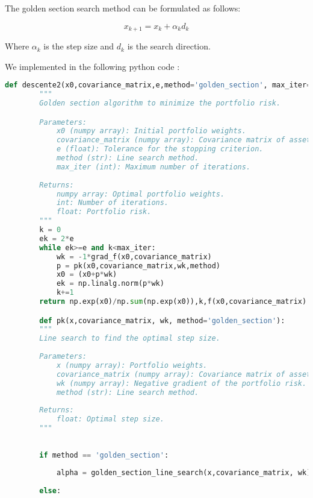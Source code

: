 \documentclass[12pt]{article}
\begin{document}
The golden section search method can be formulated as follows:

\begin{equation}
    x_{k+1} = x_k + \alpha_k d_k
\end{equation}
    
    Where $\alpha_k$ is the step size and $d_k$ is the search direction.

We implemented in the following python code :


\begin{lstlisting}[language=Python]
    def descente2(x0,covariance_matrix,e,method='golden_section', max_iter=10000):
        """
        Golden section algorithm to minimize the portfolio risk.

        Parameters:
            x0 (numpy array): Initial portfolio weights.
            covariance_matrix (numpy array): Covariance matrix of asset returns.
            e (float): Tolerance for the stopping criterion.
            method (str): Line search method.
            max_iter (int): Maximum number of iterations.
            
        Returns:
            numpy array: Optimal portfolio weights.
            int: Number of iterations.
            float: Portfolio risk.
        """
        k = 0
        ek = 2*e
        while ek>=e and k<max_iter:
            wk = -1*grad_f(x0,covariance_matrix)
            p = pk(x0,covariance_matrix,wk,method)
            x0 = (x0+p*wk)
            ek = np.linalg.norm(p*wk)
            k+=1
        return np.exp(x0)/np.sum(np.exp(x0)),k,f(x0,covariance_matrix)

        def pk(x,covariance_matrix, wk, method='golden_section'):
        """
        Line search to find the optimal step size.
    
        Parameters:
            x (numpy array): Portfolio weights.
            covariance_matrix (numpy array): Covariance matrix of asset returns.
            wk (numpy array): Negative gradient of the portfolio risk.
            method (str): Line search method.
    
        Returns:
            float: Optimal step size.
        """
    
    
        if method == 'golden_section':
    
            alpha = golden_section_line_search(x,covariance_matrix, wk)
    
        else:
    

\end{lstlisting}
\end{document}
